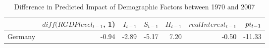 \begin{table}[ht]
\centering
\begin{tabular}{rrrrrrr}
  \hline
 & $diff(RGDPlevel_{t-1}$, 1) & $I_{t-1}$ & $S_{t-1}$ & $H_{t-1}$ & $realInterest_{t-1}$ & $\\pi_{t-1}$ \\ 
  \hline
Germany & -0.94 & -2.89 & -5.17 & 7.20 & -0.50 & -11.33 \\ 
   \hline
\end{tabular}
\caption{Diﬀerence in Predicted Impact of Demographic Factors between 1970 and 2007} 
\end{table}
